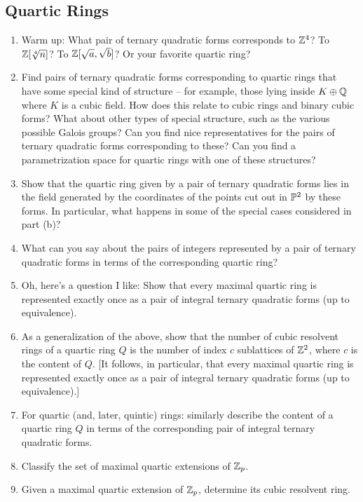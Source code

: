 \documentclass[12pt,amsfont]{amsart}
\begin{document}
\subsection{ {\bf Quartic Rings}}
\begin{enumerate}
         \item Warm up: What pair of ternary quadratic forms
           corresponds to ${\mathbb Z}^4$?
To ${\mathbb Z}[\sqrt[4]{n}]$? To ${\mathbb Z}[\sqrt{a},\sqrt{b}]$? Or your favorite quartic 
ring?
\item Find pairs of ternary quadratic forms corresponding to quartic
   rings that have some special kind of structure -- for example, those
   lying inside $K \oplus {\mathbb Q}$ where $K$ is a cubic field.  How does
   this relate to cubic rings and binary cubic forms? What about other
   types of special structure, such as the various possible Galois
   groups?  Can you find nice representatives for the pairs of ternary
   quadratic forms corresponding to these?  Can you find
   a parametrization space for quartic rings with one of these
   structures?
\item Show that the quartic ring given by a pair of ternary quadratic
   forms lies in the field generated by the coordinates of the points
   cut out in $\mathbb{P}^2$ by these forms.  In particular,
   what happens in some of the special cases considered in part (b)?
\item What can you say about the pairs of integers represented by a
   pair of ternary quadratic forms in terms of the corresponding
   quartic ring?
   
\item Oh, here's a question I like: Show that every maximal quartic ring is
represented exactly once as a pair of integral ternary quadratic forms (up
to equivalence).

\item As a generalization of the above, show that the number of cubic resolvent rings of a
quartic ring $Q$ is the number of index $c$ sublattices of ${\mathbb Z}^2$, where
$c$ is the content of $Q$.  [It follows, in particular, that every maximal
quartic ring is represented exactly once as a pair of integral ternary
quadratic forms (up to equivalence).]

\item For quartic (and, later, quintic) rings: similarly describe the content of a quartic ring $Q$
in terms of the corresponding pair of integral ternary quadratic forms.

\item Classify the set of maximal quartic extensions of ${\mathbb Z}_p$.

\item Given a maximal quartic extension of ${\mathbb Z}_p$, determine its cubic resolvent ring.


\end{enumerate}
\end{document}
